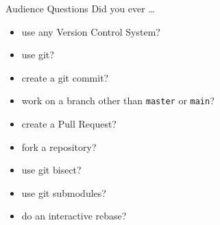 \begin{frame}[t]{Audience Questions}
  Did you ever …
  \begin{itemize}[<+->]
    \item use any Version Control System?
    \item use git?
    \item create a git commit?
    \item work on a branch other than \texttt{master} or \texttt{main}?
    \item create a Pull Request?
    \item fork a repository?
    \item use git bisect?
    \item use git submodules?
    \item do an interactive rebase?
  \end{itemize}
\end{frame}

\copywarning{}









